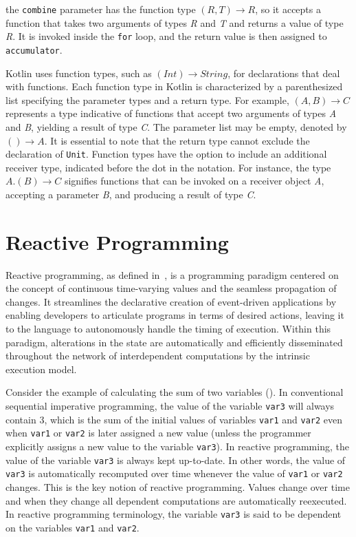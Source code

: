 

the \texttt{combine} parameter has the function type \((R, T) \rightarrow R\), so it accepts a function that takes two arguments of types \textit{R} and \textit{T} and returns a value of type \textit{R}. It is invoked inside the \texttt{for} loop, and the return value is then assigned to \texttt{accumulator}.

Kotlin uses function types, such as \((Int) \rightarrow String\), for declarations that deal with functions. Each function type in Kotlin is characterized by a parenthesized list specifying the parameter types and a return type. For example, \((A, B) \rightarrow C\) represents a type indicative of functions that accept two arguments of types \textit{A} and \textit{B}, yielding a result of type \textit{C}. The parameter list may be empty, denoted by \(() \rightarrow A\). It is essential to note that the return type cannot exclude the declaration of \texttt{Unit}. Function types have the option to include an additional receiver type, indicated before the dot in the notation. For instance, the type \(A.(B) \rightarrow C\) signifies functions that can be invoked on a receiver object \textit{A}, accepting a parameter \textit{B}, and producing a result of type \textit{C}.

\section{Reactive Programming}

Reactive programming, as defined in~\cite{Bainomugisha2013}, is a programming paradigm centered on the concept of continuous time-varying values and the seamless propagation of changes. It streamlines the declarative creation of event-driven applications by enabling developers to articulate programs in terms of desired actions, leaving it to the language to autonomously handle the timing of execution. Within this paradigm, alterations in the state are automatically and efficiently disseminated throughout the network of interdependent computations by the intrinsic execution model.

Consider the example of calculating the sum of two variables (). In conventional sequential imperative programming, the value of the variable \texttt{var3} will always contain 3, which is the sum of the initial values of variables \texttt{var1} and \texttt{var2} even when \texttt{var1} or \texttt{var2} is later assigned a new value (unless the programmer explicitly assigns a new value to the variable \texttt{var3}). In reactive programming, the value of the variable \texttt{var3} is always kept up-to-date. In other words, the value of \texttt{var3} is automatically recomputed over time whenever the value of \texttt{var1} or \texttt{var2} changes.
This is the key notion of reactive programming. Values change over time and when they change all dependent computations are automatically reexecuted. In reactive programming terminology, the variable \texttt{var3} is said to be dependent on the variables \texttt{var1} and \texttt{var2}.

